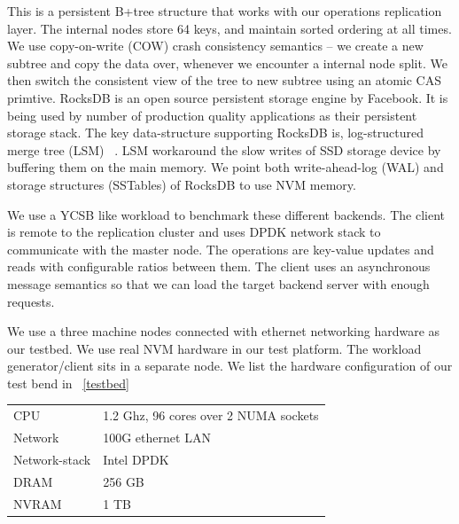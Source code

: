 This is a persistent B+tree structure that works with our operations replication layer. The internal nodes
store 64 keys, and maintain sorted ordering at all times. We use copy-on-write (COW) crash consistency 
semantics -- we create a new subtree and copy the data over, whenever we encounter a internal node split. 
We then switch the consistent view of the tree to new subtree using an atomic CAS primtive. 
RocksDB is an open source persistent storage engine by Facebook. It is being used by number of production quality
applications as their persistent storage stack. The key data-structure supporting RocksDB is, log-structured merge
tree (LSM) ~\cite{lsm}. LSM workaround the slow writes of SSD storage device by buffering them on the main memory.
We point both write-ahead-log (WAL) and storage structures (SSTables) of RocksDB to use NVM memory.

We use a YCSB like workload to benchmark these different backends. The client is remote to the replication
cluster and uses DPDK network stack to communicate with the master node. The operations are key-value updates and
reads with configurable ratios between them. The client uses an asynchronous message semantics so that we can
load the target backend server with enough requests.

We use a three machine nodes connected with ethernet networking hardware as our testbed. We use real NVM hardware
in our test platform. The workload generator/client sits in a separate node. We list the hardware configuration of
our test bend in ~\autoref{testbed}
\begin{center}
	\begin{tabular}{l|l}
		\hline
		CPU & 1.2 Ghz, 96 cores over 2 NUMA sockets \\
		Network & 100G ethernet LAN \\
		Network-stack & Intel DPDK \\
		DRAM & 256 GB \\
		NVRAM & 1 TB \\
	\end{tabular}
\end{center}


